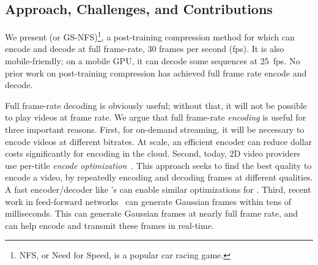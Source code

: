 \subsection{Approach, Challenges, and Contributions}\label{sec:appr-chall-contr}

%
We present \gsnfs{} (or GS-NFS)\footnote{NFS, or Need for Speed, is a popular car racing game.}, a post-training compression method for \dgs{} which can encode and decode at full frame-rate, 30 frames per second (fps).
%
It is also mobile-friendly; on a mobile GPU, it can decode some \dgs{} sequences at 25~fps.
%
No prior work on post-training compression has achieved full frame rate encode and decode.



Full frame-rate decoding is obviously useful; without that, it will not be possible to play \dgs{} videos at frame rate.
%
We argue that full frame-rate \textit{encoding} is useful for 
three important reasons.
%
First, for on-demand streaming, it will be necessary to encode \dgs{} videos at different bitrates.
%
At scale, an efficient encoder can reduce dollar costs significantly for encoding in the cloud.
%
%
Second, today, 2D video providers use per-title \textit{encode optimization}~\cite{netflix_rdo}.
%
This approach seeks to find the best quality to encode a video, by repeatedly encoding and decoding frames at different qualities.
%
A fast encoder/decoder like \gsnfs{}'s can enable similar optimizations for \dgs{}.
%
Third, recent work in feed-forward \gs{} networks~\cite{zhou2024gpsplus} can generate Gaussian frames within tens of milliseconds.
%
This can generate Gaussian frames at nearly full frame rate, and \gsnfs{} can help encode and transmit these frames in real-time.

